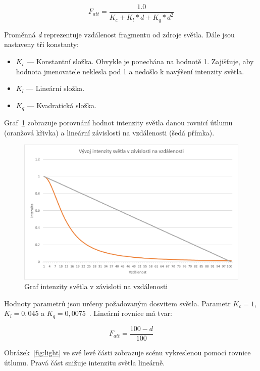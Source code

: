 \documentclass[thesis=M,czech]{FITthesis}[2019/12/23]
\begin{document}
$$ F_{att} = \frac{1.0}{K_c + K_l * d + K_q * d^2} $$

Proměnná \textit{d} reprezentuje vzdálenost fragmentu od zdroje světla. Dále jsou nastaveny tři konstanty:

\begin{itemize}
\item $K_c$ --- Konstantní složka. Obvykle je ponechána na hodnotě 1. Zajišťuje, aby hodnota jmenovatele neklesla pod 1 a nedošlo k navýšení intenzity světla.

\item $K_l$ --- Lineární složka. 

\item $K_q$ --- Kvadratická složka.
\end{itemize}

Graf~\ref{fig:lum} zobrazuje porovnání hodnot intenzity světla danou rovnicí útlumu (oranžová křivka) a lineární závislostí na vzdálenosti (šedá přímka).

\begin{figure}\centering
	\includegraphics[width=\textwidth]{images/lum}
	\caption[Graf intenzity světla v závisloti na vzdálenosti]{Graf intenzity světla v závisloti na vzdálenosti}\label{fig:lum}
\end{figure}

Hodnoty parametrů jsou určeny požadovaným dosvitem světla. Parametr $K_c = 1$, $K_l = 0,045$ a $K_q = 0,0075$~\cite{ogre_att}. Lineární rovnice má tvar:

$$ F_{att} = \frac{100 - d}{100} $$

Obrázek~\ref{fig:light} ve své levé části zobrazuje scénu vykreslenou pomocí rovnice útlumu. Pravá část snižuje intenzitu světla lineárně.

\end{document}
